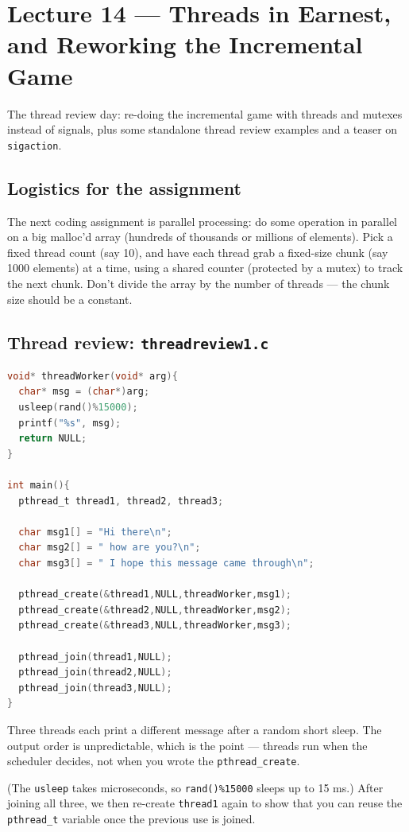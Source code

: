 \documentclass[11pt]{article}
\begin{document}
\section{Lecture 14 --- Threads in Earnest, and Reworking the Incremental Game}

The thread review day: re-doing the incremental game with threads
and mutexes instead of signals, plus some standalone thread review
examples and a teaser on \texttt{sigaction}.

\subsection*{Logistics for the assignment}

The next coding assignment is parallel processing: do some
operation in parallel on a big malloc'd array (hundreds of
thousands or millions of elements). Pick a fixed thread count (say
10), and have each thread grab a fixed-size chunk (say 1000
elements) at a time, using a shared counter (protected by a mutex)
to track the next chunk. Don't divide the array by the number of
threads --- the chunk size should be a constant.

\subsection*{Thread review: \texttt{threadreview1.c}}

\begin{lstlisting}[language=C]
void* threadWorker(void* arg){
  char* msg = (char*)arg;
  usleep(rand()%15000);
  printf("%s", msg);
  return NULL;
}

int main(){
  pthread_t thread1, thread2, thread3;

  char msg1[] = "Hi there\n";
  char msg2[] = " how are you?\n";
  char msg3[] = " I hope this message came through\n";

  pthread_create(&thread1,NULL,threadWorker,msg1);
  pthread_create(&thread2,NULL,threadWorker,msg2);
  pthread_create(&thread3,NULL,threadWorker,msg3);

  pthread_join(thread1,NULL);
  pthread_join(thread2,NULL);
  pthread_join(thread3,NULL);
}
\end{lstlisting}

Three threads each print a different message after a random short
sleep. The output order is unpredictable, which is the point ---
threads run when the scheduler decides, not when you wrote the
\texttt{pthread\_create}.

(The \texttt{usleep} takes microseconds, so \texttt{rand()\%15000}
sleeps up to 15 ms.) After joining all three, we then re-create
\texttt{thread1} again to show that you can reuse the
\texttt{pthread\_t} variable once the previous use is joined.
\end{document}
